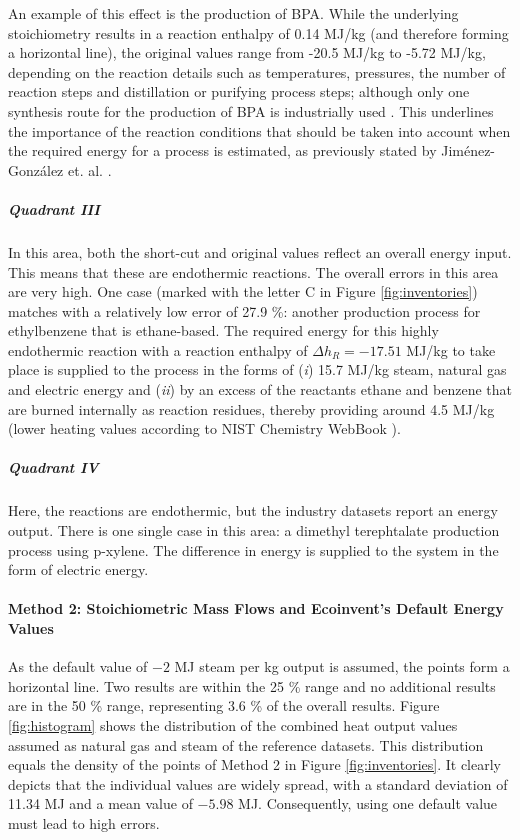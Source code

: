 An example of this effect is the production of \acl{BPA}. While the underlying stoichiometry results in a reaction enthalpy of 0.14 MJ/kg (and therefore forming a horizontal line), the original values range from -20.5 MJ/kg to -5.72 MJ/kg, depending on the reaction details such as temperatures, pressures, the number of reaction steps and distillation or purifying process steps; although only one synthesis route for the production of \acl{BPA} is industrially used \cite{Fiege.2000}. This underlines the importance of the reaction conditions that should be taken into account when the required energy for a process is estimated, as previously stated by Jiménez-González et. al.  \cite{JimenezGonzalez.2000}.  

\subparagraph{Quadrant III} 
In this area, both the short-cut and original values reflect an overall energy input. This means that these are endothermic reactions. The overall errors in this area are very high. 
One case (marked with the letter C in Figure \ref{fig:inventories}) matches with a relatively low error of 27.9 \%: another production process for ethylbenzene that is ethane-based. The required energy for this highly endothermic reaction with a reaction enthalpy of $\Delta h_R = -17.51$ MJ/kg to take place is supplied to the process in the forms of (\textit{i}) 15.7 MJ/kg steam, natural gas and electric energy and (\textit{ii}) by an excess of the reactants ethane and benzene that are burned internally as reaction residues, thereby providing around 4.5 MJ/kg (lower heating values according to NIST Chemistry WebBook \cite{NationalInstituteofStandardsandTechnology.2018}).

\subparagraph{Quadrant IV} 
Here, the reactions are endothermic, but the industry datasets report an energy output. There is one single case in this area: a dimethyl terephtalate production process using p-xylene. The difference in energy is supplied to the system in the form of electric energy.


\paragraph{Method 2: Stoichiometric Mass Flows and Ecoinvent's Default Energy Values}

As the default value of $-2$ MJ steam per kg output is assumed, the points form a horizontal line. Two results are within the 25 \% range and no additional results are in the 50 \% range, representing 3.6 \% of the overall results. Figure  \ref{fig:histogram} shows the distribution of the combined heat output values assumed as natural gas and steam of the reference datasets. This distribution equals the density of the points of Method 2 in Figure \ref{fig:inventories}. It clearly depicts that the individual values are widely spread, with a standard deviation of 11.34 MJ and a mean value of $-5.98$ MJ. Consequently, using one default value must lead to high errors.

